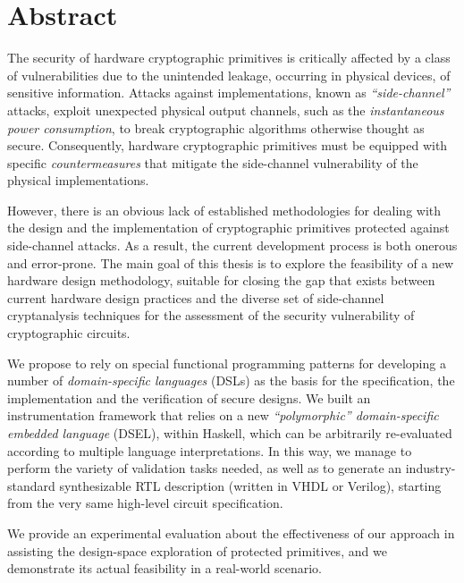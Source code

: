 \newpage
\chapter*{Abstract}




The security of hardware cryptographic primitives is critically affected 
by a class of vulnerabilities due to the unintended leakage, occurring in physical 
devices, of sensitive information. 
Attacks against implementations, known as \emph{``side-channel''} attacks, exploit 
unexpected physical output channels, such as the \emph{instantaneous 
power consumption}, to break cryptographic algorithms otherwise thought as secure.
Consequently, hardware cryptographic primitives must be equipped with specific 
\emph{countermeasures} that mitigate the side-channel vulnerability of the physical 
implementations. 

However, there is an obvious lack of established methodologies for dealing with
the design and the implementation of cryptographic primitives protected against side-channel 
attacks. As a result, the current development process is both onerous and error-prone.
The main goal of this thesis is to explore the feasibility of a new hardware design methodology,
suitable for closing the gap that exists between current hardware design practices and the 
diverse set of side-channel cryptanalysis techniques for the assessment of the security 
vulnerability of cryptographic circuits.

We propose to rely on special functional programming patterns for developing a 
number of \emph{domain-specific languages} (DSLs) as the basis for the specification, the 
implementation and the verification of secure designs.
We built an instrumentation framework that relies on a new \emph{``polymorphic'' 
domain-specific embedded language} (DSEL), within Haskell,
which can be arbitrarily re-evaluated according 
to multiple language interpretations. In this way, we manage to perform the variety of 
validation tasks needed, as well as to generate an industry-standard synthesizable RTL description (written in VHDL or Verilog), %
starting from the very same high-level circuit specification.

We provide an experimental evaluation about the effectiveness of our approach in assisting 
the design-space exploration of protected primitives, and we demonstrate its actual feasibility in a real-world scenario.